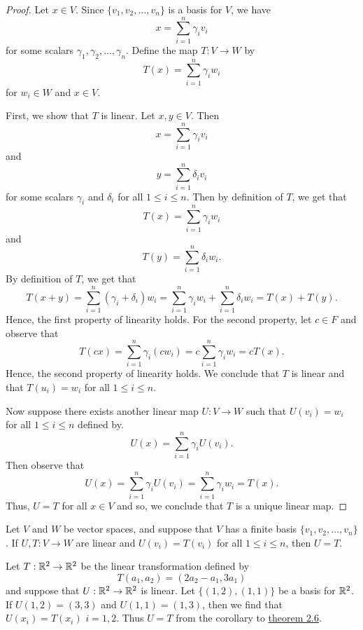 \begin{proof}
Let \( x \in V  \). Since \( \{ v_{1}, v_{2}, \dots, v_{n} \}  \) is a basis for \( V  \), we have
\[  x = \sum_{ i=1 }^{ n } \gamma_{i} v_{i}  \] for some scalars \( \gamma_{1}, \gamma_{2}, \dots, \gamma_{n}  \). Define the map \( T: V \to W  \) by
\[  T(x) = \sum_{ i=1 }^{ n } \gamma_{i} w_{i}  \]
for \( w_{i} \in W  \) and \( x \in V  \). 

First, we show that \( T  \) is linear. Let \( x,y \in V  \). Then 
\[ x =  \sum_{ i=1 }^{ n } \gamma_{i} v_{i}  \] and 
\[ y =  \sum_{ i=1 }^{ n } \delta_{i} v_{i}  \] for some scalars \( \gamma_{i}  \) and \( \delta_{i}  \) for all \( 1 \leq i \leq n \). Then by definition of \( T  \), we get that 
\[  T(x) = \sum_{ i=1 }^{ n } \gamma_{i} w_{i}  \] and 
\[ T(y) = \sum_{ i=1 }^{ n } \delta_{i} w_{i}. \]
By definition of \( T  \), we get that  
\[  T(x+y) = \sum_{ i=1 }^{ n } (\gamma_{i} + \delta_{i}) w_{i} = \sum_{ i=1 }^{ n } \gamma_{i} w_{i} + \sum_{ i=1 }^{ n } \delta_{i} w_{i} = T(x) + T(y).  \]
Hence, the first property of linearity holds. For the second property, let \( c \in F  \) and observe that
\[  T(cx) = \sum_{ i=1 }^{ n } \gamma_{i} (cw_{i}) = c \sum_{ i=1 }^{ n } \gamma_{i} w_{i} = c T(x). \]
Hence, the second property of linearity holds. We conclude that \( T  \) is linear and that \( T(u_{i}) = w_{i}  \) for all \( 1 \leq i \leq n \).

Now suppose there exists another linear map \( U: V \to W  \) such that \( U(v_{i}) = w_{i}  \) for all \( 1 \leq i \leq n \) defined by.
\[ U(x) = \sum_{i =1  }^{ n } \gamma_{i} U(v_{i}).  \]
Then observe that
\[ U(x) = \sum_{ i=1 }^{ n } \gamma_{i} U(v_{i}) = \sum_{ i=1 }^{ n } \gamma_{i} w_{i} = T(x). \]
Thus, \( U = T  \) for all \( x \in V  \) and so, we conclude that \( T  \) is a unique linear map.
\end{proof}

\begin{corollary}\label{Corollary to Theorem 2.6}
  Let \( V  \) and \( W  \) be vector spaces, and suppose that \( V  \) has a finite basis \( \{ v_{1}, v_{2}, \dots, v_{n} \}  \). If \( U,T : V \to W  \) are linear and \( U(v_{i}) = T(v_{i}) \) for all \( 1 \leq i \leq n \), then \( U = T  \).  
\end{corollary}

\begin{eg}
    Let \( T : \mathbb{R}^{2} \to \mathbb{R}^{2}  \) be the linear transformation defined by 
    \[  T(a_{1}, a_{2}) = (2a_{2} - a_{1}, 3a_{1}) \]
    and suppose that \( U: \mathbb{R}^{2} \to \mathbb{R}^{2}  \) is linear. Let \( \{ (1,2), (1,1) \}  \) be a basis for \( \mathbb{R}^{2} \). If \( U(1,2) = (3,3)  \) and \( U(1,1) = (1,3)  \), then we find that \( U(x_{i}) = T(x_{i}) \) \( i = 1,2 \). Thus \( U = T  \) from the corollary to {\hyperref[Theorem 2.6]{theorem 2.6}}. 
\end{eg}

